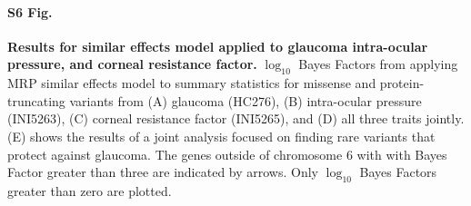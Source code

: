 \paragraph*{S6 Fig.}
\label{glaucoma_similar}
{\bf Results for similar effects model applied to glaucoma intra-ocular pressure, and corneal resistance factor.} $\log_{10}$ Bayes Factors from applying MRP similar effects model to summary statistics for missense and protein-truncating variants from (A) glaucoma (HC276), (B) intra-ocular pressure (INI5263), (C) corneal resistance factor (INI5265), and (D) all three traits jointly. (E) shows the results of a joint analysis focused on finding rare variants that protect against glaucoma. The genes outside of chromosome 6 with with Bayes Factor greater than three are indicated by arrows. Only $\log_{10}$ Bayes Factors greater than zero are plotted.

